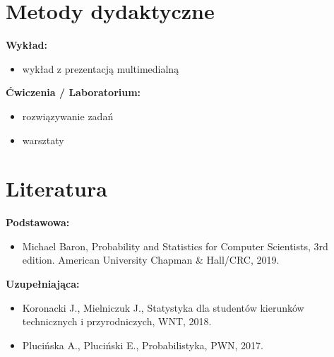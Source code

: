 \documentclass[12pt, a4paper]{article}
\begin{document}
\section{Metody dydaktyczne}

\textbf{Wykład:}
\begin{itemize}
  \item wykład z prezentacją multimedialną
\end{itemize}
\vspace{4pt}
\textbf{Ćwiczenia / Laboratorium:}
\begin{itemize}
  \item rozwiązywanie zadań
  \item warsztaty
\end{itemize}
\vspace{4pt}


\section{Literatura}

\textbf{Podstawowa:}
\begin{itemize}
  \item Michael Baron, Probability and Statistics for Computer Scientists, 3rd edition. American University Chapman \& Hall/CRC, 2019.
\end{itemize}

\textbf{Uzupełniająca:}
\begin{itemize}
  \item Koronacki J., Mielniczuk J., Statystyka dla studentów kierunków technicznych i przyrodniczych, WNT, 2018.
  \item Plucińska A., Pluciński E., Probabilistyka, PWN, 2017.
\end{itemize}
\end{document}
